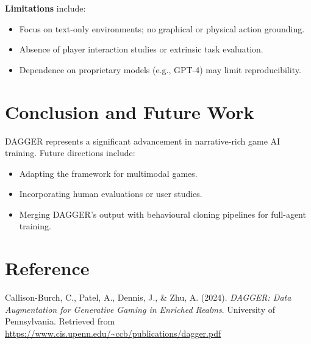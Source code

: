 \documentclass[12pt,a4paper]{article}
\begin{document}
\textbf{Limitations} include:
\begin{itemize}
  \item Focus on text-only environments; no graphical or physical action grounding.
  \item Absence of player interaction studies or extrinsic task evaluation.
  \item Dependence on proprietary models (e.g., GPT-4) may limit reproducibility.
\end{itemize}

\section*{Conclusion and Future Work}

DAGGER represents a significant advancement in narrative-rich game AI training. Future directions include:
\begin{itemize}
  \item Adapting the framework for multimodal games.
  \item Incorporating human evaluations or user studies.
  \item Merging DAGGER's output with behavioural cloning pipelines for full-agent training.
\end{itemize}

\section*{Reference}

\noindent Callison-Burch, C., Patel, A., Dennis, J., \& Zhu, A. (2024). \textit{DAGGER: Data Augmentation for Generative Gaming in Enriched Realms}. University of Pennsylvania. Retrieved from \url{https://www.cis.upenn.edu/~ccb/publications/dagger.pdf}
\end{document}
